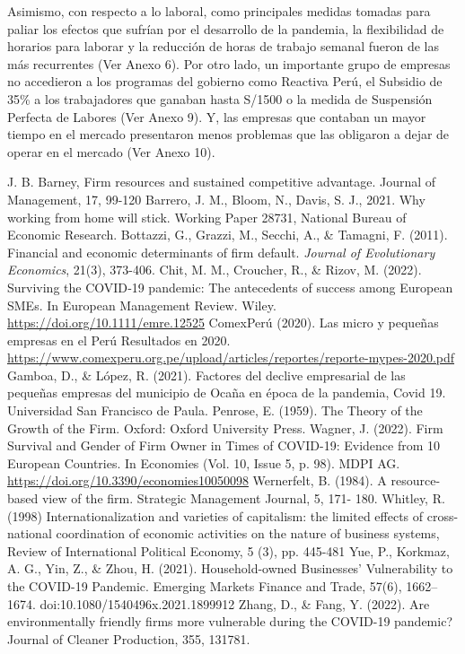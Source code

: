 \documentclass[12pt]{article}
\begin{document}
        Asimismo, con respecto a lo laboral, como principales medidas tomadas para paliar los efectos que sufrían por el
        desarrollo de la pandemia, la flexibilidad de horarios para laborar y la reducción de horas de trabajo semanal
        fueron de las más recurrentes (Ver Anexo 6). Por otro lado, un importante grupo de empresas no accedieron a los
        programas del gobierno como Reactiva Perú, el Subsidio de 35\% a los trabajadores que ganaban hasta S/1500 o
        la medida de Suspensión Perfecta de Labores (Ver Anexo 9). Y, las empresas que contaban un mayor tiempo en el
        mercado presentaron menos problemas que las obligaron a dejar de operar en el mercado (Ver Anexo 10).
        \newpage
        
        \begin{thebibliography}{10}
             J. B. Barney, Firm resources and sustained competitive advantage. Journal of Management, 17, 99-120
             Barrero, J. M., Bloom, N., Davis, S. J., 2021. Why working from home will stick. Working Paper 28731, National Bureau of Economic Research.
             Bottazzi, G., Grazzi, M., Secchi, A., \& Tamagni, F. (2011). Financial and economic determinants of firm default. \textit{Journal of Evolutionary Economics}, 21(3), 373-406.
             Chit, M. M., Croucher, R., \& Rizov, M. (2022). Surviving the COVID‐19 pandemic: The antecedents of success among European SMEs. In European Management Review. Wiley. \textcolor{blue}{\url{https://doi.org/10.1111/emre.12525}}
             ComexPerú (2020). Las micro y pequeñas empresas en el Perú Resultados en 2020. \textcolor{blue}{\url{https://www.comexperu.org.pe/upload/articles/reportes/reporte-mypes-2020.pdf}}
             Gamboa, D., \& López, R. (2021). Factores del declive empresarial de las pequeñas empresas del municipio de Ocaña en época de la pandemia, Covid 19. Universidad San Francisco de Paula.
             Penrose, E. (1959). The Theory of the Growth of the Firm. Oxford: Oxford University Press.
             Wagner, J. (2022). Firm Survival and Gender of Firm Owner in Times of COVID-19: Evidence from 10 European Countries. In Economies (Vol. 10, Issue 5, p. 98). MDPI AG. \textcolor{blue}{\url{https://doi.org/10.3390/economies10050098}}
             Wernerfelt, B. (1984). A resource-based view of the firm. Strategic Management Journal, 5, 171- 180.
             Whitley, R. (1998) Internationalization and varieties of capitalism: the limited effects of cross-national coordination of economic activities on the nature of business systems, Review of International Political Economy, 5 (3), pp. 445-481
             Yue, P., Korkmaz, A. G., Yin, Z., \& Zhou, H. (2021). Household-owned Businesses’ Vulnerability to the COVID-19 Pandemic. Emerging Markets Finance and Trade, 57(6), 1662–1674. doi:10.1080/1540496x.2021.1899912
             Zhang, D., \& Fang, Y. (2022). Are environmentally friendly firms more vulnerable during the COVID-19 pandemic? Journal of Cleaner Production, 355, 131781.
        \end{thebibliography}
\end{document}
